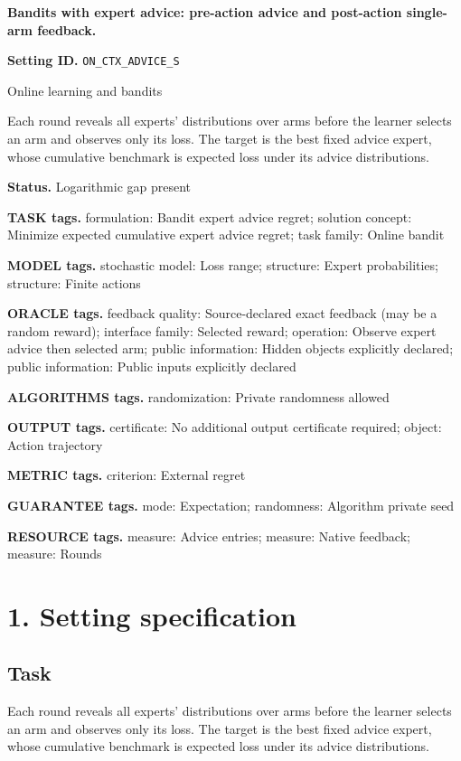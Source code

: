\documentclass[10pt,a4paper]{article}
\begin{document}
\raggedright

{\LARGE\bfseries\sffamily\color{AtlasNavy} Bandits with expert advice: pre-action advice and post-action single-arm feedback.\par}\vspace{5pt}
\textbf{Setting ID.} \texttt{ON\_\allowbreak{}CTX\_\allowbreak{}ADVICE\_\allowbreak{}S}

Online learning and bandits

Each round reveals all experts' distributions over arms before the learner selects an arm and observes only its loss. The target is the best fixed advice expert, whose cumulative benchmark is expected loss under its advice distributions.

\textbf{Status.} Logarithmic gap present

\textbf{TASK tags.} formulation: Bandit expert advice regret; solution concept: Minimize expected cumulative expert advice regret; task family: Online bandit

\textbf{MODEL tags.} stochastic model: Loss range; structure: Expert probabilities; structure: Finite actions

\textbf{ORACLE tags.} feedback quality: Source-declared exact feedback (may be a random reward); interface family: Selected reward; operation: Observe expert advice then selected arm; public information: Hidden objects explicitly declared; public information: Public inputs explicitly declared

\textbf{ALGORITHMS tags.} randomization: Private randomness allowed

\textbf{OUTPUT tags.} certificate: No additional output certificate required; object: Action trajectory

\textbf{METRIC tags.} criterion: External regret

\textbf{GUARANTEE tags.} mode: Expectation; randomness: Algorithm private seed

\textbf{RESOURCE tags.} measure: Advice entries; measure: Native feedback; measure: Rounds

\section{1. Setting specification}
\subsection{Task}
Each round reveals all experts' distributions over arms before the learner selects an arm and observes only its loss. The target is the best fixed advice expert, whose cumulative benchmark is expected loss under its advice distributions.
\end{document}
